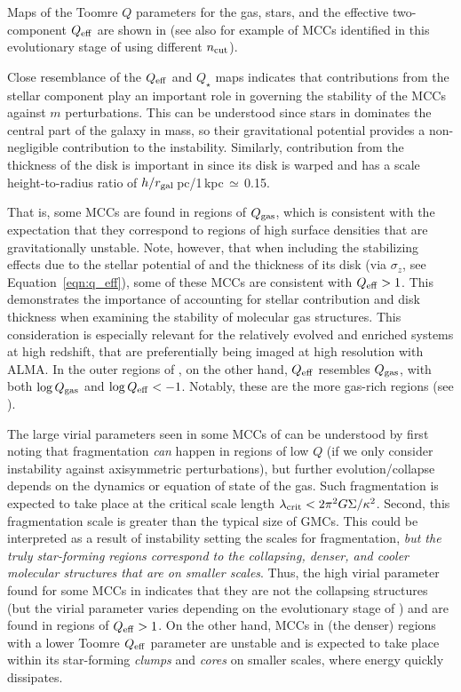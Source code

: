 \IfFileExists{emulateapjlegacy.cls}{\documentclass[iop]{emulateapjlegacy}}{\documentclass[iop]{emulateapj}}
\begin{document}
Maps of the Toomre $Q$ parameters for the gas, stars, and the effective two-component $Q_{\rm eff}$ are shown in 
(see also  for example of MCCs identified in this evolutionary stage of \flower
using different $n_{\rm cut}$).

Close resemblance of the $Q_{\rm eff}$ and $Q_{\star}$ maps indicates that contributions from the stellar component play an important role in governing the stability of the MCCs against $m$ perturbations. This can be understood since stars in \flower dominates the central part of the galaxy in mass, so their gravitational potential provides a non-negligible contribution to the instability.
Similarly, contribution from the thickness of the disk is important in \flower since its disk is warped and
has a scale height-to-radius ratio of $h/r_{\rm gal}$\,pc/1\,kpc\,$\simeq$\,0.15.

That is, some MCCs are found in regions of $Q_{\rm gas}$, which is consistent with the expectation that
they correspond to regions of high surface densities that are gravitationally unstable.
Note, however, that when including the stabilizing effects due to the stellar potential of \flower and the
thickness of its disk (via $\sigma_z$, see Equation~\ref{eqn:q_eff}), some of these MCCs are
consistent with $Q_{\rm eff} > 1$.
This demonstrates the importance of accounting for stellar contribution and disk thickness
when examining the stability of molecular gas structures.
This consideration is especially relevant for the relatively evolved and enriched systems at high redshift,
that are preferentially being imaged at high resolution with ALMA.
In the outer regions of \flower, on the other hand, $Q_{\rm eff}$ resembles $Q_{\rm gas}$, with
both $\log{Q_{\rm gas}}$ and $\log{Q_{\rm eff}} < -1$.
Notably, these are the more gas-rich regions (see ).

The large virial parameters seen in some MCCs of \flower can be understood
by first noting that fragmentation {\em can} happen in regions of low $Q$
(if we only consider instability against axisymmetric perturbations),
but further evolution/collapse depends on the dynamics or equation of state of the gas.
%
Such fragmentation is expected to take place at the critical scale length $\lambda_{\rm crit} < 2 \pi^2 G \Sigma / \kappa^2$.
Second, this fragmentation scale is greater than the typical size of GMCs.
%
This could be interpreted as a result of instability setting the scales for fragmentation,
{\em but the truly star-forming regions correspond to the collapsing, denser, and cooler molecular structures that are on smaller scales}.
%
Thus, the high virial parameter found for some MCCs in \flower
indicates that they are not the collapsing structures (but the virial parameter varies depending on the evolutionary stage
of \flower) and are found in regions of $Q_{\rm eff}>1$.
On the other hand, MCCs in (the denser) regions with a lower Toomre $Q_{\rm eff}$ parameter are unstable
and \SF is expected to take place within its star-forming {\it clumps} and {\it cores} on smaller scales,
where energy quickly dissipates. %
\end{document}
